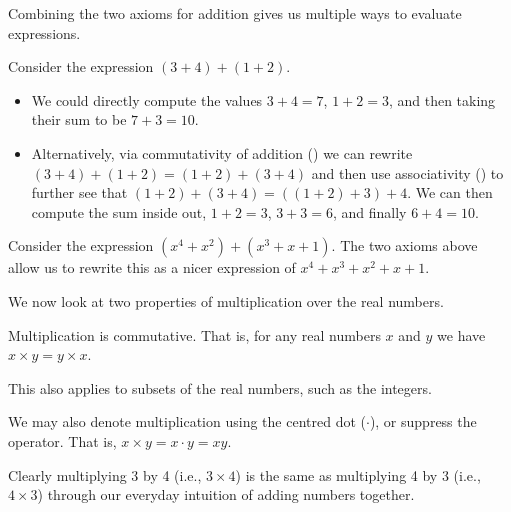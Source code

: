 Combining the two axioms for addition gives us multiple ways to evaluate expressions.
\begin{example}
    Consider the expression $(3 + 4) + (1 + 2)$.
    \begin{itemize}
        \item We could directly compute the values $3 + 4 = 7$, $1 + 2 = 3$, and then taking their sum to be $7 + 3 = 10$.
        \item Alternatively, via commutativity of addition () we can rewrite $(3 + 4) + (1 + 2) = (1+2)+(3+4)$ and then use associativity () to further see that $(1+2)+(3+4) = ((1+2)+3)+4$. We can then compute the sum inside out, $1 + 2 = 3$, $3 + 3 = 6$, and finally $6 + 4 = 10$.
    \end{itemize}
\end{example}
\begin{example}
    Consider the expression $(x^4 + x^2) + (x^3 + x + 1)$. The two axioms above allow us to rewrite this as a nicer expression of $x^4 + x^3 + x^2 + x + 1$.
\end{example}

We now look at two properties of multiplication over the real numbers.
\begin{axiom}\label{axiom-multiplication-is-commutative}
    Multiplication is commutative. That is, for any real numbers $x$ and $y$ we have $x \times y = y \times x$.
\end{axiom}
\begin{remark}
    This also applies to subsets of the real numbers, such as the integers.
\end{remark}
\begin{remark}
    We may also denote multiplication using the centred dot ($\cdot$), or suppress the operator. That is, $x\times y = x\cdot y = xy$.
\end{remark}
\begin{example}
    Clearly multiplying 3 by 4 (i.e., $3 \times 4$) is the same as multiplying 4 by 3 (i.e., $4 \times 3$) through our everyday intuition of adding numbers together.
\end{example}

